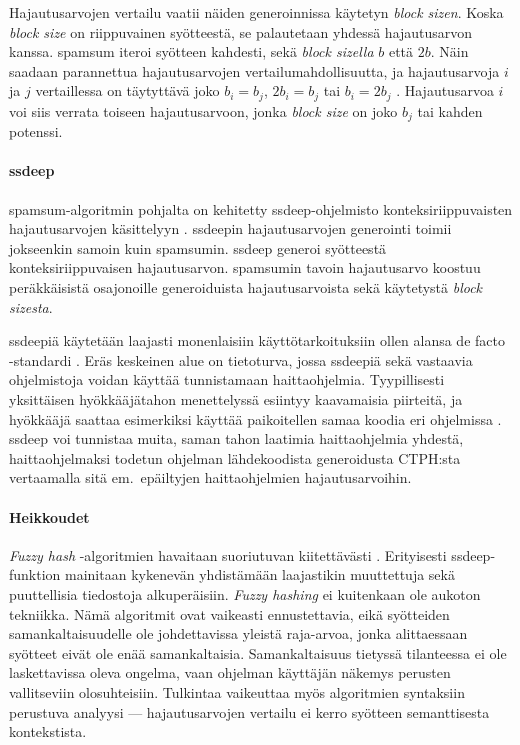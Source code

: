 \documentclass[12pt, a4paper]{article}
\begin{document}
	Hajautusarvojen vertailu vaatii näiden generoinnissa käytetyn
	\textit{block sizen}. Koska \textit{block size} on riippuvainen syötteestä,
	se palautetaan yhdessä hajautusarvon kanssa. spamsum iteroi
	syötteen kahdesti, sekä \textit{block sizella} $b$ että $2b$.
	Näin saadaan parannettua hajautusarvojen vertailumahdollisuutta, ja
	hajautusarvoja $i$ ja $j$ vertaillessa on täytyttävä joko
	$b_i = b_j$, $2b_i = b_j$ tai $b_i = 2b_j$ \parencite{IDENT}. Hajautusarvoa $i$ voi
	siis verrata toiseen hajautusarvoon, jonka \textit{block size} on joko $b_j$ tai kahden potenssi.

	\paragraph{ssdeep}
	spamsum-algoritmin pohjalta on kehitetty ssdeep-ohjelmisto
	konteksiriippuvaisten hajautusarvojen käsittelyyn \parencite{SSDEEP}. ssdeepin
	hajautusarvojen generointi toimii jokseenkin samoin kuin
	spamsumin. ssdeep generoi syötteestä konteksiriippuvaisen
	hajautusarvon. spamsumin tavoin
	hajautusarvo koostuu peräkkäisistä osajonoille generoiduista
	hajautusarvoista sekä käytetystä \textit{block sizesta}.

	ssdeepiä käytetään laajasti monenlaisiin käyttötarkoituksiin
	ollen alansa de facto -standardi \parencite{SSDEEP}.
	Eräs keskeinen alue on tietoturva, jossa ssdeepiä
	sekä vastaavia ohjelmistoja voidan käyttää tunnistamaan
	haittaohjelmia. Tyypillisesti yksittäisen hyökkääjätahon
	menettelyssä esiintyy kaavamaisia piirteitä, ja hyökkääjä
	saattaa esimerkiksi käyttää paikoitellen samaa koodia eri
	ohjelmissa \parencite{RANSO}. ssdeep voi tunnistaa muita, saman tahon laatimia
	haittaohjelmia yhdestä, haittaohjelmaksi todetun ohjelman
	lähdekoodista generoidusta CTPH:sta vertaamalla sitä
	em.\ epäiltyjen haittaohjelmien hajautusarvoihin.

	\paragraph{Heikkoudet}
	\textit{Fuzzy hash} -algoritmien havaitaan suoriutuvan kiitettävästi \parencite{RANSO}.
	Erityisesti ssdeep-funktion mainitaan kykenevän yhdistämään laajastikin
	muuttettuja sekä puuttellisia tiedostoja alkuperäisiin. \textit{Fuzzy hashing} ei
	kuitenkaan ole aukoton tekniikka. Nämä algoritmit ovat vaikeasti
	ennustettavia, eikä syötteiden samankaltaisuudelle ole johdettavissa
	yleistä raja-arvoa, jonka alittaessaan syötteet eivät ole enää samankaltaisia.
	Samankaltaisuus tietyssä tilanteessa ei ole laskettavissa oleva ongelma,
	vaan ohjelman käyttäjän näkemys perusten vallitseviin olosuhteisiin.
	Tulkintaa vaikeuttaa myös algoritmien syntaksiin perustuva analyysi
	--- hajautusarvojen vertailu ei kerro syötteen semanttisesta kontekstista.
\end{document}
